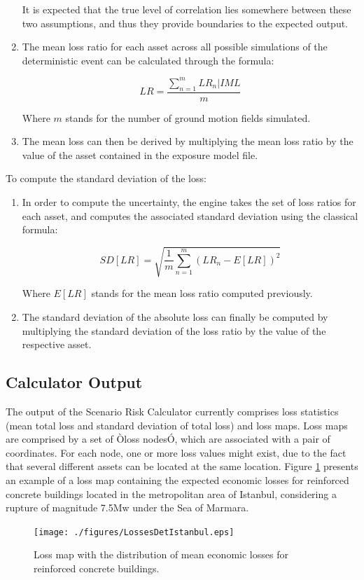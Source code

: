 \begin{enumerate}
It is expected that the true level of correlation lies somewhere between these two assumptions, and thus they provide boundaries to the expected output. 


\item The mean loss ratio for each asset across all possible simulations of the deterministic event can be calculated through the formula:

\begin{equation}
LR=\frac{\sum^m_{n=1}LR_n|IML}{m}
\end{equation}

Where $m$ stands for the number of ground motion fields simulated.

\item The mean loss can then be derived by multiplying the mean loss ratio by the value of the asset contained in the exposure model file.

\end{enumerate}

To compute the standard deviation of the loss:

\begin{enumerate}

\item In order to compute the uncertainty, the engine takes the set of 
    loss ratios for each asset, and computes the associated standard 
    deviation using the classical formula:

\begin{equation}
SD[LR]=\sqrt{  \frac{1}{m}\sum_{n=1}^m{(LR_n-E[LR])^2} }
\end{equation}

Where $E[LR]$ stands for the mean loss ratio computed previously.

\item The standard deviation of the absolute loss can finally be computed
    by multiplying the standard deviation of the loss ratio by the value 
    of the respective asset.

\end{enumerate}

\subsection{Calculator Output}
The output of the Scenario Risk Calculator currently comprises loss statistics (mean total loss and standard deviation of total loss) and loss maps. Loss maps are comprised by a set of Òloss nodesÓ, which are associated with a pair of coordinates. For each node, one or more loss values might exist, due to the fact that several different assets can be located at the same location.  Figure \ref{fig:detlosses} presents an example of a loss map containing the expected economic losses for reinforced concrete buildings located in the metropolitan area of Istanbul, considering a rupture of magnitude 7.5Mw under the Sea of Marmara.
\begin{figure}[ht]
\centering
\texttt{[image: ./figures/LossesDetIstanbul.eps]}
\caption{Loss map with the distribution of mean economic losses for reinforced concrete buildings.}
\label{fig:detlosses}
\end{figure} 


